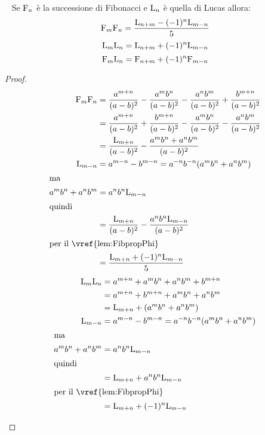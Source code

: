 \begin{thm}~\cite{Rabinowitz_1996}\label{thm:FibProdSomma}
	Se $\mathrm{F}_{n}$ è la successione di Fibonacci e  $\mathrm{L}_{n}$ è quella di Lucas allora:
	\begin{equation}
		\mathrm{F}_{m}\mathrm{F}_{n}=\dfrac{\mathrm{L}_{n+m}-(-1)^n\mathrm{L}_{m-n}}{5}
	\end{equation}\label{eqn:FibProdSomma}
	\begin{equation}
	\mathrm{L}_{m}\mathrm{L}_{n}=\mathrm{L}_{n+m}+(-1)^n\mathrm{L}_{m-n}
	\end{equation}\label{eqn:LucProdSomma}
\begin{equation}
	\mathrm{F}_{m}\mathrm{L}_{n}=\mathrm{F}_{n+m}+(-1)^n\mathrm{F}_{m-n}
\end{equation}\label{eqn:LucFibProdSomma}
\end{thm}
\begin{proof}
\begin{align*}
	\Fib{m}\Fib{n}={}&\dfrac{a^{m+n}}{(a-b)^2}-\dfrac{a^mb^n}{(a-b)^2}-\dfrac{a^nb^m}{(a-b)^2}+\dfrac{b^{m+n}}{(a-b)^2}\\
	={}&\dfrac{a^{m+n}}{(a-b)^2}+\dfrac{b^{m+n}}{(a-b)^2}-\dfrac{a^mb^n}{(a-b)^2}-\dfrac{a^nb^m}{(a-b)^2}\\
	={}&\dfrac{\Luc{m+n}}{(a-b)^2}-\dfrac{a^mb^n+a^nb^m}{(a-b)^2}\\
	\Luc{m-n}={}&a^{m-n}-b^{m-n}=a^{-n}b^{-n}(a^mb^n+a^nb^m)\\
	\intertext{ma}
	a^mb^n+a^nb^m={}&a^{n}b^{n}\Luc{m-n}\\
	\intertext{quindi}
	={}&\dfrac{\Luc{m+n}}{(a-b)^2}-\dfrac{a^{n}b^{n}\Luc{m-n}}{(a-b)^2}\\
	\intertext{per il~\vref{lem:FibpropPhi}}
	={}&\dfrac{\Luc{m+n}+(-1)^{n}\Luc{m-n}}{5}
\end{align*}
\begin{align*}
	\Luc{m}\Luc{n}={}&a^{m+n}+a^mb^n+a^nb^m+b^{m+n}\\
	={}&a^{m+n}+b^{m+n}+a^mb^n+a^nb^m\\
	={}&\Luc{m+n}+(a^mb^n+a^nb^m)\\
	\Luc{m-n}={}&a^{m-n}-b^{m-n}=a^{-n}b^{-n}(a^mb^n+a^nb^m)\\
	\intertext{ma}
	a^mb^n+a^nb^m={}&a^{n}b^{n}\Luc{m-n}\\
	\intertext{quindi}
	={}&\Luc{m+n}+a^{n}b^{n}\Luc{m-n}\\
	\intertext{per il~\vref{lem:FibpropPhi}}
	={}&\Luc{m+n}+(-1)^{n}\Luc{m-n}
\end{align*}
\begin{align*}

\end{align*}
\end{proof}

